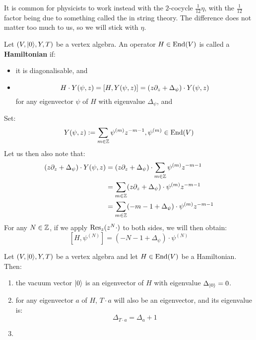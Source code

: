        \begin{remark}
            It is common for physicists to work instead with the $2$-cocycle $\frac{1}{12} \eta$, with the $\frac{1}{12}$ factor being due to something called the  in string theory. The difference does not matter too much to us, so we will stick with $\eta$. 
        \end{remark}

        \begin{definition} \label{def: hamiltonians}
            Let $(V, \lvert {0} \rangle, Y, T)$ be a vertex algebra. An operator $H \in \mathrm{End}(V)$ is called a \textbf{Hamiltonian} if:
            \begin{itemize}
                \item it is diagonalisable, and
                \item 
                    $$H \cdot Y(\psi, z) = [ H, Y(\psi, z) ] = ( z\partial_z + \Delta_\psi ) \cdot Y(\psi, z)$$
                for any eigenvector $\psi$ of $H$ with eigenvalue $\Delta_\psi$, and
            \end{itemize}
        \end{definition}
        \begin{remark}
            Set:
                $$Y(\psi, z) := \sum_{m \in \mathbb{Z}} \psi^{(m)} z^{-m - 1}, \psi^{(m)} \in \mathrm{End}(V)$$
            Let us then also note that:
                $$
                    \begin{aligned}
                        ( z\partial_z + \Delta_\psi ) \cdot Y(\psi, z) & = ( z\partial_z + \Delta_\psi ) \cdot \sum_{m \in \mathbb{Z}} \psi^{(m)} z^{-m - 1}
                        \\
                        & = \sum_{m \in \mathbb{Z}} ( z\partial_z + \Delta_\psi ) \cdot \psi^{(m)} z^{-m - 1}
                        \\
                        & = \sum_{m \in \mathbb{Z}} ( -m - 1 + \Delta_\psi ) \cdot \psi^{(m)} z^{-m - 1}
                    \end{aligned}
                $$
            For any $N \in \mathbb{Z}$, if we apply $\mathrm{Res}_z(z^N \cdot )$ to both sides, we will then obtain:
                $$[H, \psi^{(N)}] = ( -N - 1 + \Delta_\psi ) \cdot \psi^{(N)}$$
        \end{remark}
        \begin{lemma}
            Let $(V, \lvert {0} \rangle, Y, T)$ be a vertex algebra and let $H \in \mathrm{End}(V)$ be a Hamiltonian. Then:
            \begin{enumerate}
                \item the vacuum vector $\lvert {0} \rangle$ is an eigenvector of $H$ with eigenvalue $\Delta_{\lvert {0} \rangle} = 0$. 
                \item for any eigenvector $a$ of $H$, $T \cdot a$ will also be an eigenvector, and its eigenvalue is:
                    $$\Delta_{T \cdot a} = \Delta_a + 1$$
                \item 
            \end{enumerate}
        \end{lemma}
